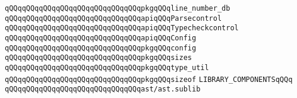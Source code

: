 \verb|qQQqqQQqqQQqqQQqqQQqqQQqqQQqqQQqpkgqQQqline_number_db|\newline
\verb|qQQqqQQqqQQqqQQqqQQqqQQqqQQqqQQqapiqQQqParsecontrol|\newline
\verb|qQQqqQQqqQQqqQQqqQQqqQQqqQQqqQQqapiqQQqTypecheckcontrol|\newline
\verb|qQQqqQQqqQQqqQQqqQQqqQQqqQQqqQQqapiqQQqConfig|\newline
\verb|qQQqqQQqqQQqqQQqqQQqqQQqqQQqqQQqpkgqQQqconfig|\newline
\newline
\verb|qQQqqQQqqQQqqQQqqQQqqQQqqQQqqQQqpkgqQQqsizes|\newline
\verb|qQQqqQQqqQQqqQQqqQQqqQQqqQQqqQQqpkgqQQqtype_util|\newline
\verb|qQQqqQQqqQQqqQQqqQQqqQQqqQQqqQQqpkgqQQqsizeof|\newline
\newline
\newline
\verb|LIBRARY_COMPONENTSqQQq|\newline
\verb|qQQqqQQqqQQqqQQqqQQqqQQqqQQqqQQqast/ast.sublib|\newline

